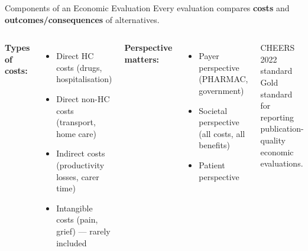 \documentclass[aspectratio=169, 12pt]{beamer}
\begin{document}
\begin{frame}{Components of an Economic Evaluation}
  \small
  Every evaluation compares \textbf{costs} and \textbf{outcomes/consequences} of alternatives.
  \vspace{0.3em}
  \begin{columns}
      \textbf{Types of costs:}
      \begin{itemize}
        \item Direct HC costs (drugs, hospitalisation)
        \item Direct non-HC costs (transport, home care)
        \item Indirect costs (productivity losses, carer time)
        \item Intangible costs (pain, grief) --- rarely included
      \end{itemize}
      \textbf{Perspective matters:}
      \begin{itemize}
        \item Payer perspective (PHARMAC, government)
        \item Societal perspective (all costs, all benefits)
        \item Patient perspective
      \end{itemize}
      \vspace{0.2em}
      \begin{alertblock}{CHEERS 2022 standard}
        \footnotesize Gold standard for reporting publication-quality economic evaluations.
      \end{alertblock}
  \end{columns}
\end{frame}
\end{document}
